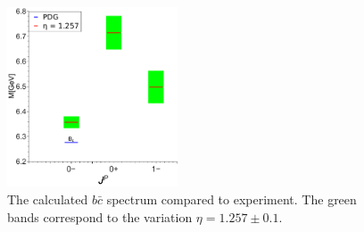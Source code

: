 \begin{figure}[!t]
  \begin{center}
    \includegraphics[width=0.45\textwidth]{figures/spectrum_bc}
    \caption{The calculated $b\bar{c}$ spectrum compared to experiment. The green bands correspond 
             to the variation $\eta=1.257\pm0.1$.}\label{fig:spectrumbc}
  \end{center}
\end{figure}
%
%
